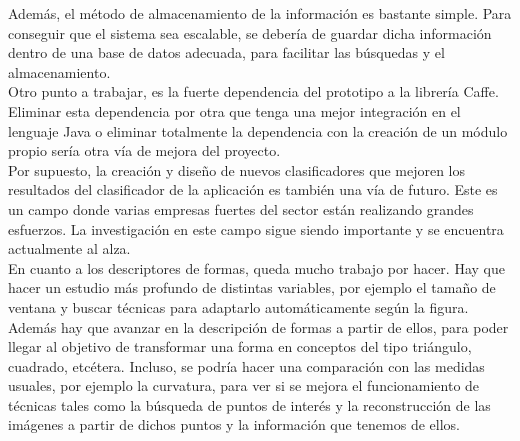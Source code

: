 Además, el método de almacenamiento de la información es bastante simple. Para conseguir que el sistema sea escalable, se debería de guardar dicha información dentro de una base de datos adecuada, para facilitar las búsquedas y el almacenamiento.\\

Otro punto a trabajar, es la fuerte dependencia del prototipo a la librería Caffe. Eliminar esta dependencia por otra que tenga una mejor integración en el lenguaje Java o eliminar totalmente la dependencia con la creación de un módulo propio sería otra vía de mejora del proyecto.\\

Por supuesto, la creación y diseño de nuevos clasificadores que mejoren los resultados del clasificador de la aplicación es también una vía de futuro. Este es un campo donde varias empresas fuertes del sector están realizando grandes esfuerzos. La investigación en este campo sigue siendo importante y se encuentra actualmente al alza.\\

En cuanto a los descriptores de formas, queda mucho trabajo por hacer. Hay que hacer un estudio más profundo de distintas variables, por ejemplo el tamaño de ventana y buscar técnicas para adaptarlo automáticamente según la figura. Además hay que avanzar en la descripción de formas a partir de ellos, para poder llegar al objetivo de transformar una forma en conceptos del tipo triángulo, cuadrado, etcétera. Incluso, se podría hacer una comparación con las medidas usuales, por ejemplo la curvatura, para ver si se mejora el funcionamiento de técnicas tales como la búsqueda de puntos de interés y la reconstrucción de las imágenes a partir de dichos puntos y la información que tenemos de ellos.\\

